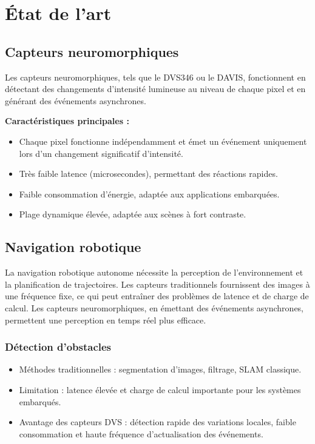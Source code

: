 \chapter{État de l’art}

\section{Capteurs neuromorphiques}

Les capteurs neuromorphiques, tels que le DVS346 ou le DAVIS, fonctionnent en détectant des changements d’intensité lumineuse au niveau de chaque pixel et en générant des événements asynchrones.  

\textbf{Caractéristiques principales :}
\begin{itemize}
    \item Chaque pixel fonctionne indépendamment et émet un événement uniquement lors d’un changement significatif d’intensité.  
    \item Très faible latence (microsecondes), permettant des réactions rapides.  
    \item Faible consommation d’énergie, adaptée aux applications embarquées.  
    \item Plage dynamique élevée, adaptée aux scènes à fort contraste.  
\end{itemize}

\section{Navigation robotique}

La navigation robotique autonome nécessite la perception de l’environnement et la planification de trajectoires. Les capteurs traditionnels fournissent des images à une fréquence fixe, ce qui peut entraîner des problèmes de latence et de charge de calcul. Les capteurs neuromorphiques, en émettant des événements asynchrones, permettent une perception en temps réel plus efficace.  

\subsection{Détection d’obstacles}

\begin{itemize}
    \item Méthodes traditionnelles : segmentation d’images, filtrage, SLAM classique.  
    \item Limitation : latence élevée et charge de calcul importante pour les systèmes embarqués.  
    \item Avantage des capteurs DVS : détection rapide des variations locales, faible consommation et haute fréquence d’actualisation des événements.  
\end{itemize}

